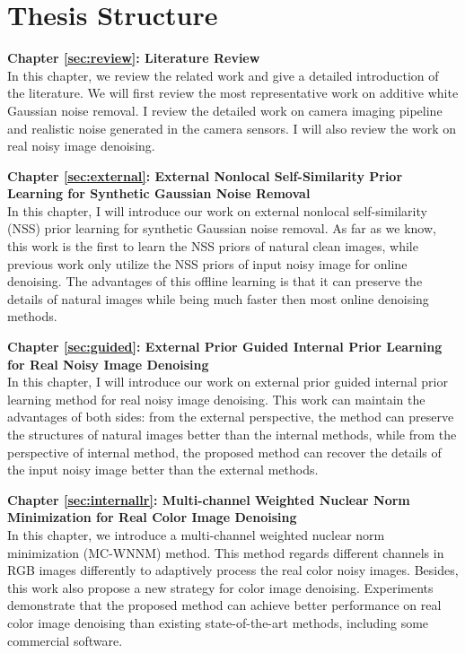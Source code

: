 \section{Thesis Structure}
\label{sec:intro:structure}


\textbf{Chapter \ref{sec:review}: Literature Review} \\[0.2em]

In this chapter, we review the related work and give a detailed introduction of the literature. We will first review the most representative work on additive white Gaussian noise removal. I review the detailed work on camera imaging pipeline and realistic noise generated in the camera sensors. I will also review the work on real noisy image denoising.



\textbf{Chapter \ref{sec:external}: External Nonlocal Self-Similarity Prior Learning for Synthetic Gaussian Noise Removal} \\[0.2em]

In this chapter, I will introduce our work on external nonlocal self-similarity (NSS) prior learning for synthetic Gaussian noise removal. As far as we know, this work is the first to learn the NSS priors of natural clean images, while previous work only utilize the NSS priors of input noisy image for online denoising. The advantages of this offline learning is that it can preserve the details of natural images while being much faster then most online denoising methods.


\textbf{Chapter \ref{sec:guided}: External Prior Guided Internal Prior Learning for Real Noisy Image Denoising} \\[0.2em]

In this chapter, I will introduce our work on external prior guided internal prior learning method for real noisy image denoising. This work can maintain the advantages of both sides: from the external perspective, the method can preserve the structures of natural images better than the internal methods, while from the perspective of internal method, the proposed method can recover the details of the input noisy image better than the external methods.



\textbf{Chapter \ref{sec:internallr}: Multi-channel Weighted Nuclear Norm Minimization for Real Color Image Denoising} \\[0.2em]

In this chapter, we introduce a multi-channel weighted nuclear norm minimization (MC-WNNM) method. This method regards different channels in RGB images differently to adaptively process the real color noisy images. Besides, this work also propose a new strategy for color image denoising. Experiments demonstrate that the proposed method can achieve better performance on real color image denoising than existing state-of-the-art methods, including some commercial software.



